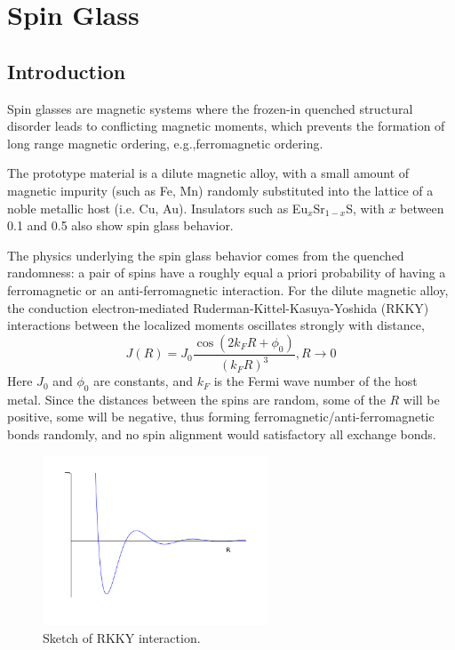 \chapter{Spin Glass}
\label{chap:SGintro}
\section{Introduction}
Spin glasses are magnetic systems where the frozen-in quenched structural 
disorder leads to conflicting magnetic moments, which prevents the formation 
of long range magnetic ordering, e.g.,ferromagnetic ordering.

The prototype material is a dilute magnetic alloy, with a small amount of 
magnetic impurity (such as Fe, Mn) randomly substituted into the lattice of a 
noble metallic host (i.e. Cu, Au). Insulators such as Eu$_x$Sr$_{1-x}$S, with $x$
between 0.1 and 0.5 also show spin glass behavior.
 
The physics underlying the spin glass behavior comes from the quenched 
randomness: a pair of spins have a roughly equal a priori probability of having
a ferromagnetic or an anti-ferromagnetic interaction. For the dilute magnetic 
alloy, the conduction electron-mediated 
Ruderman-Kittel-Kasuya-Yoshida (RKKY) interactions between the localized moments
 oscillates strongly with distance, 
 \begin{equation}
   \label{eq:RKKY}
   J(R)=J_0\frac{\cos(2k_FR+\phi_0)}{(k_FR)^3}, R\rightarrow 0
 \end{equation}
Here $J_0$ and $\phi_0$ are constants, and $k_F$ is the Fermi wave number of the
host metal. Since the distances between the spins are random, some of the $R$
will be positive, some will be negative,
thus forming ferromagnetic/anti-ferromagnetic bonds randomly, and no spin 
alignment would satisfactory all exchange bonds. 



\begin{figure}[!h]
  \label{fig:rkky}
  \centering
  \includegraphics[width=0.6\textwidth]{img/RKKY.png}
  \caption{Sketch of RKKY interaction.}
\end{figure}

